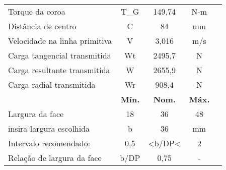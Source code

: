 \begin{table}[]
\begin{tabular}{l c c c c}
Torque da coroa                         & T_G              & 149,74          & N-m            \\
Distância de centro                     & C               & 84              & mm             \\
Velocidade na linha primitiva           & V               & 3,016           & m/s            \\
Carga tangencial transmitida            & Wt              & 2495,7          & N              \\
Carga resultante transmitida            & W               & 2655,9          & N              \\
Carga radial transmitida                & Wr              & 908,4           & N              \\
                                        & \textbf{Mín.}   & \textbf{Nom.}   & \textbf{Máx.}  \\
Largura da face                         & 18              & 36              & 48             \\
insira largura escolhida                & b               & 36              & mm             \\
Intervalo recomendado:                  & 0,5             & <b/DP<          & 2              \\
Relação de largura da face              & b/DP            & 0,75            & -             
\end{tabular}
\end{table}